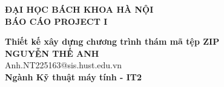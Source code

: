 \documentclass[DoAn.tex]{subfiles}
\begin{document}
\begin{titlepage}
\thispagestyle{empty}
\begin{center}

{\textbf{\large{ĐẠI HỌC BÁCH KHOA HÀ NỘI}}}\\[4cm]

{\textbf{\huge{ BÁO CÁO PROJECT I}}}\\[1cm]
{\textbf{\Large{Thiết kế xây dựng chương trình thám mã tệp ZIP}}\\[1cm]

{\textbf{\large{NGUYỄN THẾ ANH}}}\\
{\large{Anh.NT225163@sis.hust.edu.vn}}\\[0.5cm]

{\textbf{\large{Ngành Kỹ thuật máy tính - IT2}}}\\

\vspace{2cm}
\begin{table}[H]
\centering
{}
\end{table}}
\end{center}



\end{titlepage}
\end{document}
